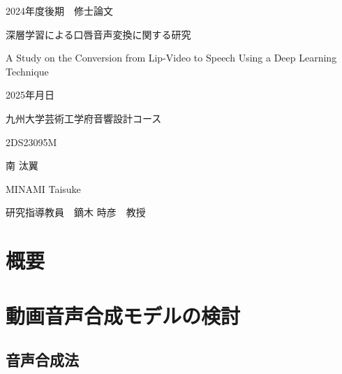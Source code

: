 \documentclass[12pt]{jarticle}
\numberwithin{equation}{section}    %
\numberwithin{figure}{section}      %
\numberwithin{table}{section}      %
\begin{document}
\begin{titlepage}
    \begin{center}
        {\Large 2024年度後期　修士論文}
        \vspace{120truept}

        {\huge 深層学習による口唇音声変換に関する研究}
        \vspace{30truept}

        {\huge A Study on the Conversion from Lip-Video to Speech Using a Deep Learning Technique}
        \vspace{120truept}

        {\Large 2025年月日}
        \vspace{10truept}

        {\Large 九州大学芸術工学府音響設計コース}
        \vspace{70truept}

        {\Large 2DS23095M}
        \vspace{10truept}

        {\Large 南 汰翼}
        \vspace{10truept}

        {\Large MINAMI Taisuke}
        \vspace{30truept}

        {\Large 研究指導教員　鏑木 時彦　教授}
    \end{center}
\end{titlepage}

\section*{概要}
\thispagestyle{empty}
\clearpage

\setcounter{tocdepth}{3}
\tableofcontents
\thispagestyle{empty}
\clearpage

\pagestyle{plain}
\setcounter{page}{1}


\clearpage


\clearpage


\clearpage

\section{動画音声合成モデルの検討}
\subsection{音声合成法}

\end{document}
